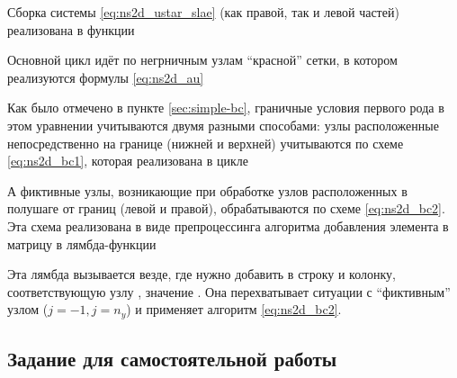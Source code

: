 Сборка системы \eqref{eq:ns2d_ustar_slae} (как правой, так и левой частей) реализована
в функции

Основной цикл идёт по негрничным узлам ``красной'' сетки,
в котором реализуются формулы \eqref{eq:ns2d_au}

Как было отмечено в пункте \ref{sec:simple-bc},
граничные условия первого рода в этом уравнении
учитываются двумя разными способами:
узлы расположенные непосредственно на границе (нижней и верхней)
учитываются по схеме \eqref{eq:ns2d_bc1}, которая реализована в цикле

А фиктивные узлы, возникающие при обработке
узлов расположенных в полушаге от границ (левой и правой),
обрабатываются по схеме \eqref{eq:ns2d_bc2}.
Эта схема реализована в виде
препроцессинга алгоритма добавления элемента в матрицу в лямбда-функции

Эта лямбда вызывается везде, где нужно добавить в строку 
и колонку, соответствующую узлу , значение .
Она перехватывает ситуации с ``фиктивным'' узлом ($j=-1, j=n_y$)
и применяет алгоритм \eqref{eq:ns2d_bc2}.


\subsection{Задание для самостоятельной работы}

